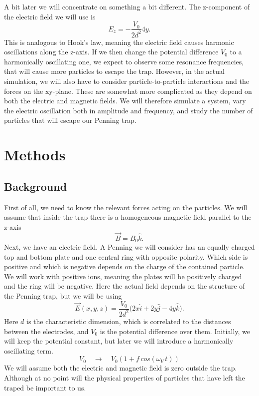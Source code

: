 \documentclass[english,notitlepage,reprint,nofootinbib]{revtex4-1}
\begin{document}
 
A bit later we will concentrate on something a bit different. The z-component of the electric field we will use is
$$  E_z =  - \frac{V_0}{2 d^2} 4 y . $$
This is analogous to Hook's law, meaning the electric field causes harmonic oscillations along the z-axis. If we then change the potential difference $V_0$ to a harmonically oscillating one, we expect to observe some resonance frequencies, that will cause more particles to escape the trap. However, in the actual simulation, we will also have to consider particle-to-particle interactions and the forces on the xy-plane. These are somewhat more complicated as they depend on both the electric and magnetic fields. We will therefore simulate a system, vary the electric oscillation both in amplitude and frequency, and study the number of particles that will escape our Penning trap.






\section{Methods}\label{sec:methods}
\subsection{Background}

First of all, we need to know the relevant forces acting on the particles. We will assume that inside the trap there is a homogeneous magnetic field parallel to the z-axis
\begin{equation}
 \vec{B} = B_0 \hat{k}.
\end{equation}
Next, we have an electric field. A Penning we will consider has an equally charged top and bottom plate and one central ring with opposite polarity. Which side is positive and which is negative depends on the charge of the contained particle. We will work with positive ions, meaning the plates will be positively charged and the ring will be negative. Here the actual field depends on the structure of the Penning trap, but we will be using
\begin{equation}
 \vec{E}(x,y,z) = \frac{V_0}{2 d^2} \Big( 2x \hat{i} + 2y \hat{j} - 4y \hat{k} \Big).
\end{equation}
Here $d$ is the characteristic dimension, which is correlated to the distances between the electrodes, and $V_0$ is the potential difference over them. Initially, we will keep the potential constant, but later we will introduce a harmonically oscillating term.
\begin{equation}
V_0 \quad \rightarrow \quad V_0 (1 + f \, cos(\omega_V \, t))
\end{equation}
We will assume both the electric and magnetic field is zero outside the trap. Although at no point will the physical properties of particles that have left the traped be important to us.
\end{document}
